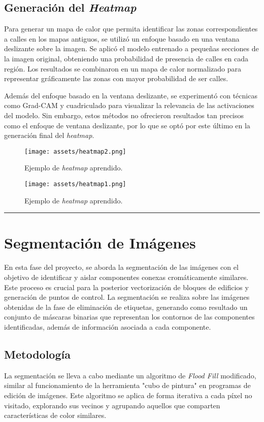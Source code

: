 \documentclass[twocolumn, fontsize=10pt]{article}
\begin{document}
\subsection{Generación del \textit{Heatmap}}
Para generar un mapa de calor que permita identificar las zonas correspondientes a calles en los mapas antiguos, se utilizó un enfoque basado en una ventana deslizante sobre la imagen. Se aplicó el modelo entrenado a pequeñas secciones de la imagen original, obteniendo una probabilidad de presencia de calles en cada región. Los resultados se combinaron en un mapa de calor normalizado para representar gráficamente las zonas con mayor probabilidad de ser calles.

Además del enfoque basado en la ventana deslizante, se experimentó con técnicas como Grad-CAM y cuadriculado para visualizar la relevancia de las activaciones del modelo. Sin embargo, estos métodos no ofrecieron resultados tan precisos como el enfoque de ventana deslizante, por lo que se optó por este último en la generación final del \textit{heatmap}.


\begin{figure}[H]
    \centering
    \texttt{[image: assets/heatmap2.png]}
    \caption{Ejemplo de \textit{heatmap} aprendido.}
    \label{fig:heatmap2}
\end{figure}

\begin{figure}[H]
    \centering
    \texttt{[image: assets/heatmap1.png]}
    \caption{Ejemplo de \textit{heatmap} aprendido.}
    \label{fig:heatmap1}
\end{figure}

\rule{\linewidth}{0.5pt}
\section{Segmentación de Imágenes}

En esta fase del proyecto, se aborda la segmentación de las imágenes con el objetivo de identificar y aislar componentes conexas cromáticamente similares. Este proceso es crucial para la posterior vectorización de bloques de edificios y generación de puntos de control. La segmentación se realiza sobre las imágenes obtenidas de la fase de eliminación de etiquetas, generando como resultado un conjunto de máscaras binarias que representan los contornos de las componentes identificadas, además de información asociada a cada componente.

\subsection{Metodología}
La segmentación se lleva a cabo mediante un algoritmo de \textit{Flood Fill}  \cite{floodfill} modificado, similar al funcionamiento de la herramienta "cubo de pintura" en programas de edición de imágenes. Este algoritmo se aplica de forma iterativa a cada píxel no visitado, explorando sus vecinos y agrupando aquellos que comparten características de color similares.
\end{document}
